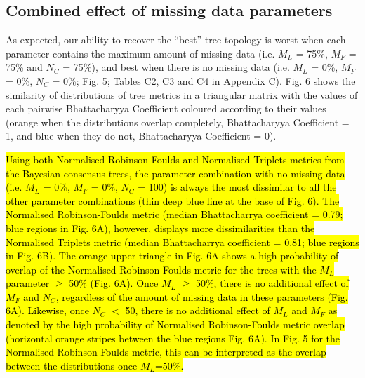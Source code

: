 \documentclass[12pt,letterpaper]{article}
\begin{document}
\subsection{Combined effect of missing data parameters}
As expected, our ability to recover the ``best'' tree topology is worst when each parameter contains the maximum amount of missing data (i.e. $M_{L}$ = 75\%, $M_{F}$ = 75\% and $N_{C}$ = 75\%), and best when there is no missing data (i.e. $M_{L}$ = 0\%, $M_{F}$ = 0\%, $N_{C}$ = 0\%; Fig. 5; Tables C2, C3 and C4 in Appendix C).
Fig. 6 shows the similarity of distributions of tree metrics in a triangular matrix with the values of each pairwise Bhattacharyya Coefficient coloured according to their values (orange when the distributions overlap completely, Bhattacharyya Coefficient = 1, and blue when they do not, Bhattacharyya Coefficient = 0). 


\hl{Using both Normalised Robinson-Foulds and Normalised Triplets metrics from the Bayesian consensus trees, the parameter combination with no missing data (i.e. $M_{L}$ = 0\%, $M_{F}$ = 0\%, $N_{C}$ = 100) is always the most dissimilar to all the other parameter combinations (thin deep blue line at the base of Fig. 6).
The Normalised Robinson-Foulds metric (median Bhattacharrya coefficient = 0.79; blue regions in Fig. 6A), however, displays more dissimilarities than the Normalised Triplets metric (median Bhattacharrya coefficient = 0.81; blue regions in Fig. 6B).
The orange upper triangle in Fig. 6A shows a high probability of overlap of the Normalised Robinson-Foulds metric for the trees with the $M_{L}$ parameter $\geq$ 50\% (Fig. 6A).
Once $M_{L}$ $\geq$ 50\%, there is no additional effect of $M_{F}$ and $N_{C}$, regardless of the amount of missing data in these parameters (Fig. 6A).
Likewise, once $N_{C}$ $<$ 50, there is no additional effect of $M_{L}$ and $M_{F}$ as denoted by the high probability of Normalised Robinson-Foulds metric overlap (horizontal orange stripes between the blue regions Fig. 6A).
In Fig. 5 for the Normalised Robinson-Foulds metric, this can be interpreted as the overlap between the distributions once $M_L$=50\%.}
\end{document}
